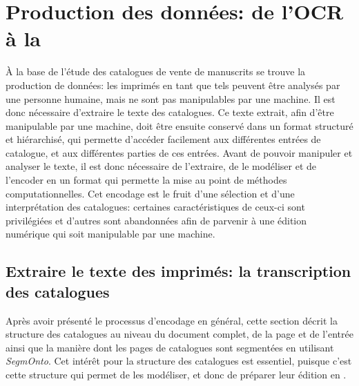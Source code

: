 \chapter{Production des données: de l'OCR à la \tei{}}
À la base de l'étude des catalogues de vente de manuscrits se trouve la production de données: les imprimés en tant que tels peuvent être analysés par une personne humaine, mais ne sont pas manipulables par une machine. Il est donc nécessaire d'extraire le texte des catalogues. Ce texte extrait, afin d'être manipulable par une machine, doit être ensuite conservé dans un format structuré et hiérarchisé, qui permette d'accéder facilement aux différentes entrées de catalogue, et aux différentes parties de ces entrées. Avant de pouvoir manipuler et analyser le texte, il est donc nécessaire de l'extraire, de le modéliser et de l'encoder en un format qui permette la mise au point de méthodes computationnelles. Cet encodage est le fruit d'une sélection et d'une interprétation des catalogues: certaines caractéristiques de ceux-ci sont privilégiées et d'autres sont abandonnées afin de parvenir à une édition numérique qui soit manipulable par une machine.

\section{Extraire le texte des imprimés: la transcription des catalogues}
Après avoir présenté le processus d'encodage en général, cette section décrit la structure des catalogues au niveau du document complet, de la page et de l'entrée ainsi que la manière dont les pages de catalogues sont segmentées en utilisant \textit{SegmOnto}. Cet intérêt pour la structure des catalogues est essentiel, puisque c'est cette structure qui permet de les modéliser, et donc de préparer leur édition en \xmltei{}.

